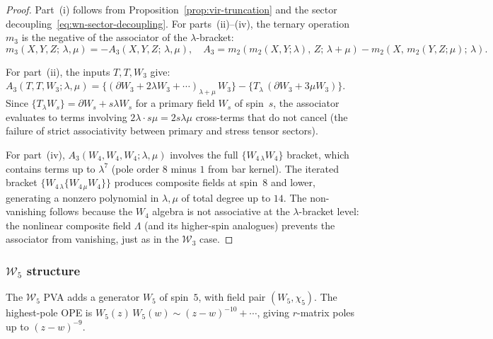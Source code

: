 \begin{proof}
Part~(i) follows from Proposition~\ref{prop:vir-truncation}
and the sector decoupling~\eqref{eq:wn-sector-decoupling}.
For parts~(ii)--(iv), the ternary operation $m_3$ is the
negative of the associator of the $\lambda$-bracket:
\[
m_3(X, Y, Z;\, \lambda, \mu)
= -A_3(X, Y, Z;\, \lambda, \mu),
\quad
A_3 = m_2(m_2(X, Y;\lambda),\, Z;\, \lambda+\mu)
 - m_2(X,\, m_2(Y, Z;\mu);\, \lambda).
\]

For part~(ii), the inputs $T, T, W_3$ give:
$A_3(T,T,W_3;\lambda,\mu)
= \{(\partial W_3 + 2\lambda W_3 + \cdots)_{\lambda+\mu}\, W_3\}
- \{T_\lambda\, (\partial W_3 + 3\mu W_3)\}$.
Since $\{T_\lambda W_s\} = \partial W_s + s\lambda W_s$
for a primary field $W_s$ of spin~$s$, the associator
evaluates to terms involving
$2\lambda \cdot s\mu = 2s \lambda\mu$ cross-terms that
do not cancel (the failure of strict associativity between
primary and stress tensor sectors).

For part~(iv), $A_3(W_4, W_4, W_4;\lambda,\mu)$ involves
the full $\{W_{4\,\lambda} W_4\}$ bracket, which contains
terms up to $\lambda^7$ (pole order $8$ minus $1$ from bar
kernel). The iterated bracket
$\{W_{4\,\lambda}\{W_{4\,\mu} W_4\}\}$ produces composite
fields at spin~$8$ and lower, generating a nonzero
polynomial in $\lambda, \mu$ of total degree up to $14$.
The non-vanishing follows because the $W_4$ algebra is
not associative at the $\lambda$-bracket level:
the nonlinear composite field $\Lambda$ (and its
higher-spin analogues) prevents the associator from
vanishing, just as in the $\mathcal{W}_3$ case.
\end{proof}

\subsubsection{$\mathcal{W}_5$ structure}

The $\mathcal{W}_5$ PVA adds a generator $W_5$ of spin~$5$, with
field pair $(W_5, \chi_5)$. The highest-pole OPE is
$W_5(z)\,W_5(w) \sim (z-w)^{-10} + \cdots$,
giving $r$-matrix poles up to $(z-w)^{-9}$.

